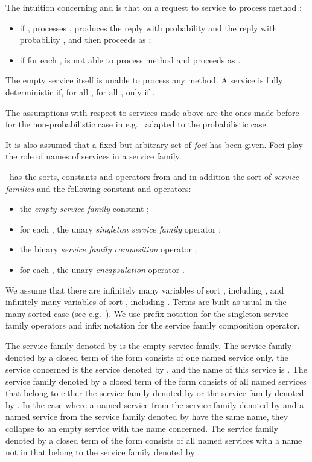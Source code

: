 \documentclass{llncs}
\begin{document}
The intuition concerning  and  is that on 
a request to service  to process method :
\begin{itemize}
\item
if ,  processes , produces the reply
 with probability  and the reply  with probability
, and then proceeds as ;
\item
if  for each ,  is not 
able to process method  and proceeds as .
\end{itemize}
The empty service  itself is unable to process any method.
A service is fully deterministic if, for all , for all , 
 only if .

The assumptions with respect to services made above are the ones made 
before for the non-probabilistic case in e.g.~\cite{BM12b} adapted to 
the probabilistic case.

It is also assumed that a fixed but arbitrary set  of
\emph{foci} has been given.
Foci play the role of names of services in a service family. 

\SFA\ has the sorts, constants and operators from  and
in addition the sort  of \emph{service families} and the 
following constant and operators:
\begin{itemize}
\item
the
\emph{empty service family} constant ;
\item
for each , the unary
\emph{singleton service family} operator
;
\item
the binary
\emph{service family composition} operator
;
\item
for each , the unary
\emph{encapsulation} operator .
\end{itemize}
We assume that there are infinitely many variables of sort ,
including , and infinitely many variables of sort ,
including .
Terms are built as usual in the many-sorted case
(see e.g.~\cite{ST99a,Wir90a}).
We use prefix notation for the singleton service family operators and
infix notation for the service family composition operator.

The service family denoted by  is the empty service family.
The service family denoted by a closed term of the form  consists 
of one named service only, the service concerned is the service denoted 
by , and the name of this service is .
The service family denoted by a closed term of the form
 consists of all named services that belong to either the
service family denoted by  or the service family denoted by .
In the case where a named service from the service family denoted by
 and a named service from the service family denoted by  have
the same name, they collapse to an empty service with the name
concerned.
The service family denoted by a closed term of the form  
consists of all named services with a name not in  that belong to
the service family denoted by .
\end{document}

